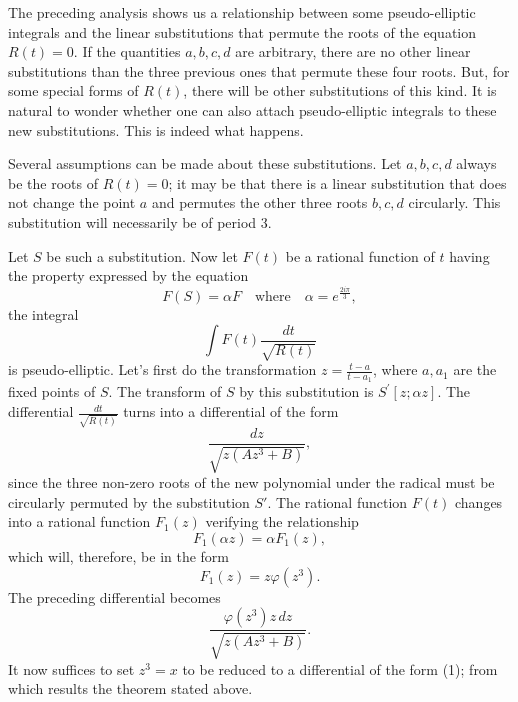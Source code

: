 \documentclass[11pt]{article}
\begin{document}
The preceding analysis shows us a relationship between some pseudo-elliptic integrals and the linear substitutions that permute the roots of the equation $R(t)=0$. If the quantities $a, b, c, d$ are arbitrary, there are no other linear substitutions than the three previous ones that permute these four roots. But, for some special forms of $R(t)$, there will be other substitutions of this kind. It is natural to wonder whether one can also attach pseudo-elliptic integrals to these new substitutions. This is indeed what happens.

Several assumptions can be made about these substitutions. Let $a, b, c, d$ always be the roots of $R(t)=0$; it may be that there is a linear substitution that does not change the point $a$ and permutes the other three roots $b, c, d$ circularly. This substitution will necessarily be of period 3.

Let $S$ be such a substitution. Now let $F(t)$ be a rational function of $t$ having the property expressed by the equation
\begin{equation*}
F(S)=\alpha F \quad \text{where} \quad \alpha=e^{\frac{2i\pi}{3}},
\end{equation*}
the integral
\begin{equation*}
\int F(t)\frac{dt}{\sqrt{R(t)}}
\end{equation*}
is pseudo-elliptic. Let's first do the transformation $z = \frac{t-a}{t-a_1}$, where $a, a_1$ are the fixed points of $S$. The transform of $S$ by this substitution is $S^{\prime}[z; \alpha z]$. The differential $\frac{dt}{\sqrt{R(t)}}$ turns into a differential of the form
\begin{equation*}
\frac{dz}{\sqrt{z(Az^{3}+B)}},
\end{equation*}
since the three non-zero roots of the new polynomial under the radical must be circularly permuted by the substitution $S'$. The rational function $F(t)$ changes into a rational function $F_1(z)$ verifying the relationship
\begin{equation*}
F_{1}(\alpha z)=\alpha F_{1}(z),
\end{equation*}
which will, therefore, be in the form
\begin{equation*}
F_{1}(z)=z\varphi(z^{3}).
\end{equation*}
The preceding differential becomes
\begin{equation*}
\frac{\varphi(z^{3})z\,dz}{\sqrt{z(Az^{3}+B)}}.
\end{equation*}
It now suffices to set $z^{3}=x$ to be reduced to a differential of the form (1); from which results the theorem stated above.
\end{document}
